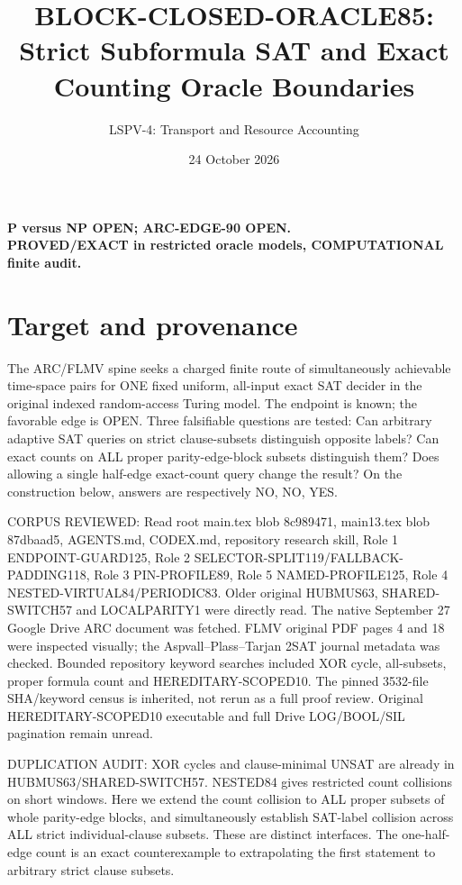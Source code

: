 \documentclass[11pt]{article}
\title{BLOCK-CLOSED-ORACLE85: Strict Subformula SAT and Exact Counting Oracle Boundaries}
\author{LSPV-4: Transport and Resource Accounting}
\date{24 October 2026}
\begin{document}
\maketitle
\begin{center}
\textbf{P versus NP OPEN; ARC-EDGE-90 OPEN.}\\
\textbf{PROVED/EXACT in restricted oracle models, COMPUTATIONAL finite audit.}
\end{center}
\section{Target and provenance}
The ARC/FLMV spine seeks a charged finite route of simultaneously achievable time-space pairs for ONE fixed uniform, all-input exact SAT decider in the original indexed random-access Turing model. The endpoint is known; the favorable edge is OPEN. Three falsifiable questions are tested: Can arbitrary adaptive SAT queries on strict clause-subsets distinguish opposite labels? Can exact counts on ALL proper parity-edge-block subsets distinguish them? Does allowing a single half-edge exact-count query change the result? On the construction below, answers are respectively NO, NO, YES.

CORPUS REVIEWED: Read root main.tex blob 8c989471, main13.tex blob 87dbaad5, AGENTS.md, CODEX.md, repository research skill, Role 1 ENDPOINT-GUARD125, Role 2 SELECTOR-SPLIT119/FALLBACK-PADDING118, Role 3 PIN-PROFILE89, Role 5 NAMED-PROFILE125, Role 4 NESTED-VIRTUAL84/PERIODIC83. Older original HUBMUS63, SHARED-SWITCH57 and LOCALPARITY1 were directly read. The native September 27 Google Drive ARC document was fetched. FLMV original PDF pages 4 and 18 were inspected visually; the Aspvall--Plass--Tarjan 2SAT journal metadata was checked. Bounded repository keyword searches included XOR cycle, all-subsets, proper formula count and HEREDITARY-SCOPED10. The pinned 3532-file SHA/keyword census is inherited, not rerun as a full proof review. Original HEREDITARY-SCOPED10 executable and full Drive LOG/BOOL/SIL pagination remain unread.

DUPLICATION AUDIT: XOR cycles and clause-minimal UNSAT are already in HUBMUS63/SHARED-SWITCH57. NESTED84 gives restricted count collisions on short windows. Here we extend the count collision to ALL proper subsets of whole parity-edge blocks, and simultaneously establish SAT-label collision across ALL strict individual-clause subsets. These are distinct interfaces. The one-half-edge count is an exact counterexample to extrapolating the first statement to arbitrary strict clause subsets.
\end{document}
